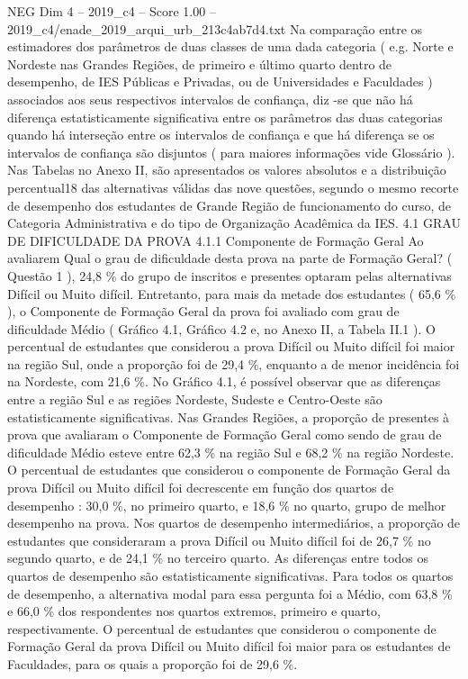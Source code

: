 \begin{textsample}{NEG Dim 4 – 2019\_c4 – Score 1.00 – 2019\_c4/enade\_2019\_arqui\_urb\_213c4ab7d4.txt}
Na comparação entre os estimadores dos parâmetros de duas classes de uma dada categoria ( e.g.
Norte e Nordeste nas Grandes Regiões, de primeiro e último quarto dentro de desempenho, de IES Públicas e Privadas, ou de Universidades e Faculdades ) associados aos seus respectivos intervalos de confiança, diz -se que não há diferença estatisticamente significativa entre os parâmetros das duas categorias quando há interseção entre os intervalos de confiança e que há diferença se os intervalos de confiança são disjuntos ( para maiores informações vide Glossário ).
Nas Tabelas no Anexo II, são apresentados os valores absolutos e a distribuição percentual18 das alternativas válidas das nove questões, segundo o mesmo recorte de desempenho dos estudantes de Grande Região de funcionamento do curso, de Categoria Administrativa e do tipo de Organização Acadêmica da IES. 4.1 GRAU DE DIFICULDADE DA PROVA 4.1.1 Componente de Formação Geral Ao avaliarem Qual o grau de dificuldade desta prova na parte de Formação Geral? ( Questão 1 ), 24,8 \% do grupo de inscritos e presentes optaram pelas alternativas Difícil ou Muito difícil.
Entretanto, para mais da metade dos estudantes ( 65,6 \% ), o Componente de Formação Geral da prova foi avaliado com grau de dificuldade Médio ( Gráfico 4.1, Gráfico 4.2 e, no Anexo II, a Tabela II.1 ).
O percentual de estudantes que considerou a prova Difícil ou Muito difícil foi maior na região Sul, onde a proporção foi de 29,4 \%, enquanto a de menor incidência foi na Nordeste, com 21,6 \%.
No Gráfico 4.1, é possível observar que as diferenças entre a região Sul e as regiões Nordeste, Sudeste e Centro-Oeste são estatisticamente significativas.
Nas Grandes Regiões, a proporção de presentes à prova que avaliaram o Componente de Formação Geral como sendo de grau de dificuldade Médio esteve entre 62,3 \% na região Sul e 68,2 \% na região Nordeste.
O percentual de estudantes que considerou o componente de Formação Geral da prova Difícil ou Muito difícil foi decrescente em função dos quartos de desempenho : 30,0 \%, no primeiro quarto, e 18,6 \% no quarto, grupo de melhor desempenho na prova.
Nos quartos de desempenho intermediários, a proporção de estudantes que consideraram a prova Difícil ou Muito difícil foi de 26,7 \% no segundo quarto, e de 24,1 \% no terceiro quarto.
As diferenças entre todos os quartos de desempenho são estatisticamente significativas.
Para todos os quartos de desempenho, a alternativa modal para essa pergunta foi a Médio, com 63,8 \% e 66,0 \% dos respondentes nos quartos extremos, primeiro e quarto, respectivamente.
O percentual de estudantes que considerou o componente de Formação Geral da prova Difícil ou Muito difícil foi maior para os estudantes de Faculdades, para os quais a proporção foi de 29,6 \%.

\end{textsample}
